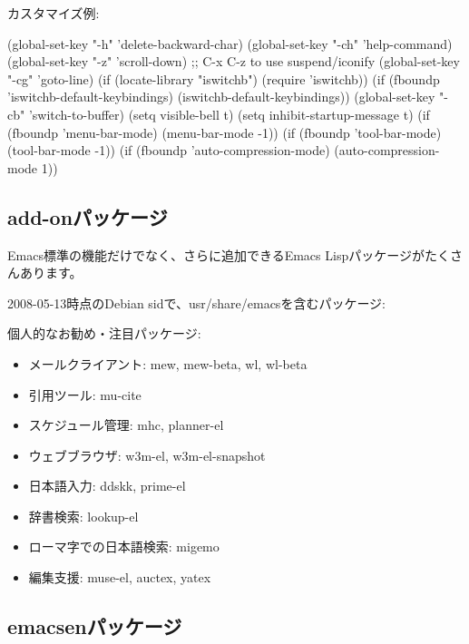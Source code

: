 \documentclass[mingoth,a4paper]{jsarticle}
\begin{document}
カスタマイズ例:

\begin{commandline}
(global-set-key "\C-h" 'delete-backward-char)
(global-set-key "\C-ch" 'help-command)
(global-set-key "\C-z" 'scroll-down) ;; C-x C-z to use suspend/iconify
(global-set-key "\C-cg" 'goto-line)
(if (locate-library "iswitchb") (require 'iswitchb))
(if (fboundp 'iswitchb-default-keybindings) (iswitchb-default-keybindings))
(global-set-key "\C-cb" 'switch-to-buffer)
(setq visible-bell t)
(setq inhibit-startup-message t)
(if (fboundp 'menu-bar-mode) (menu-bar-mode -1))
(if (fboundp 'tool-bar-mode) (tool-bar-mode -1))
(if (fboundp 'auto-compression-mode) (auto-compression-mode 1))
\end{commandline}

\subsection{add-onパッケージ}

Emacs標準の機能だけでなく、さらに追加できるEmacs Lispパッケージがたくさんあります。

2008-05-13時点のDebian sidで、usr/share/emacsを含むパッケージ:


個人的なお勧め・注目パッケージ:

\begin{itemize}
 \item メールクライアント: mew, mew-beta, wl, wl-beta
 \item 引用ツール: mu-cite
 \item スケジュール管理: mhc, planner-el
 \item ウェブブラウザ: w3m-el, w3m-el-snapshot
 \item 日本語入力: ddskk, prime-el
 \item 辞書検索: lookup-el
 \item ローマ字での日本語検索: migemo
 \item 編集支援: muse-el, auctex, yatex
\end{itemize}

\subsection{emacsenパッケージ}
\end{document}
